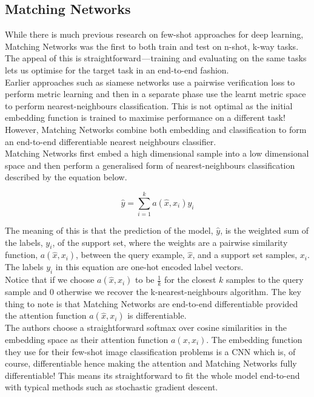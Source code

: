 \subsection{Matching Networks}

While there is much previous research on few-shot approaches for deep learning, Matching Networks \cite{matchingnet} was the first to both train and test on n-shot, k-way tasks. The appeal of this is straightforward — training and evaluating on the same tasks lets us optimise for the target task in an end-to-end fashion. \\

Earlier approaches such as siamese networks use a pairwise verification loss to perform metric learning and then in a separate phase use the learnt metric space to perform nearest-neighbours classification. This is not optimal as the initial embedding function is trained to maximise performance on a different task! However, Matching Networks combine both embedding and classification to form an end-to-end differentiable nearest neighbours classifier. \\

Matching Networks first embed a high dimensional sample into a low dimensional space and then perform a generalised form of nearest-neighbours classification described by the equation below.

\begin{equation}
    \hat{y} = \sum_{i=1}^{k} a(\hat{x}, x_{i}) y_{i}
\end{equation}

The meaning of this is that the prediction of the model, $\hat{y}$, is the weighted sum of the labels, $y_i$, of the support set, where the weights are a pairwise similarity function, $a(\hat{x}, x_i)$, between the query example, $\hat{x}$, and a support set samples, $x_i$. The labels $y_i$ in this equation are one-hot encoded label vectors. \\

Notice that if we choose $a(\hat{x}, x_i)$ to be $\frac{1}{k}$ for the closest $k$ samples to the query sample and 0 otherwise we recover the k-nearest-neighbours algorithm. The key thing to note is that Matching Networks are end-to-end differentiable provided the attention function $a(\hat{x}, x_i)$ is differentiable. \\

The authors choose a straightforward softmax over cosine similarities in the embedding space as their attention function $a(x, x_i)$. The embedding function they use for their few-shot image classification problems is a CNN which is, of course, differentiable hence making the attention and Matching Networks fully differentiable! This means its straightforward to fit the whole model end-to-end with typical methods such as stochastic gradient descent.

